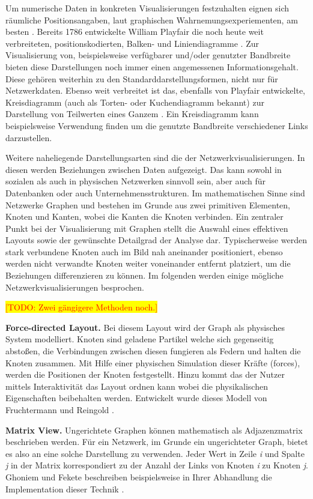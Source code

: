 \documentclass[draft=false
              ,paper=a4
              ,twoside=false
              ,fontsize=11pt
              ,headsepline
              ,BCOR10mm
              ,DIV11
              ]{scrbook}
\newcommand{\TODO}[1]{\colorbox{yellow}{\textcolor{red}{[TODO: #1]}}}
\begin{document}
Um numerische Daten in konkreten Visualisierungen festzuhalten eignen sich räumliche Positionsangaben, laut graphischen Wahrnemungsexperiementen, am besten \cite{heer_tour_2010}. Bereits 1786 entwickelte William Playfair die noch heute weit verbreiteten, positionskodierten, Balken- und Liniendiagramme \cite{playfair_playfairs_1768}. Zur Visualisierung von, beispielsweise verfügbarer und/oder genutzter Bandbreite bieten diese Darstellungen noch immer einen angemessenen Informationsgehalt. Diese gehören weiterhin zu den Standarddarstellungsformen, nicht nur für Netzwerkdaten. Ebenso weit verbreitet ist das, ebenfalls von Playfair entwickelte, Kreisdiagramm (auch als Torten- oder Kuchendiagramm bekannt) zur Darstellung von Teilwerten eines Ganzem \cite{playfair_statistical_1801}. Ein Kreisdiagramm kann beispielsweise Verwendung finden um die genutzte Bandbreite verschiedener Links darzustellen. 

Weitere naheliegende Darstellungsarten sind die der Netzwerkvisualisierungen. In diesen werden Beziehungen zwischen Daten aufgezeigt. Das kann sowohl in sozialen als auch in physischen Netzwerken sinnvoll sein, aber auch für Datenbanken oder auch Unternehmensstrukturen. Im mathematischen Sinne sind Netzwerke Graphen und bestehen im Grunde aus zwei primitiven Elementen, Knoten und Kanten, wobei die Kanten die Knoten verbinden. Ein zentraler Punkt bei der Visualisierung mit Graphen stellt die Auswahl eines effektiven Layouts sowie der gewünschte Detailgrad der Analyse dar. Typischerweise werden stark verbundene Knoten auch im Bild nah aneinander positioniert, ebenso werden nicht verwandte Knoten weiter voneinander entfernt platziert, um die Beziehungen differenzieren zu können. Im folgenden werden einige mögliche Netzwerkvisualisierungen besprochen.

\TODO{Zwei gängigere Methoden noch.}

\textbf{Force-directed Layout.}  Bei diesem Layout wird der Graph als physisches System modelliert. Knoten sind geladene Partikel welche sich gegenseitig abstoßen, die Verbindungen zwischen diesen fungieren als Federn und halten die Knoten zusammen. Mit Hilfe einer physischen Simulation dieser Kräfte (forces), werden die Positionen der Knoten festgestellt. Hinzu kommt das der Nutzer mittels Interaktivität das Layout ordnen kann wobei die physikalischen Eigenschaften beibehalten werden. Entwickelt wurde dieses Modell von Fruchtermann und Reingold \cite{Fruchterman91graphdrawing}. 

\textbf{Matrix View.} Ungerichtete Graphen können mathematisch als Adjazenzmatrix beschrieben werden. Für ein Netzwerk, im Grunde ein ungerichteter Graph, bietet es also an eine solche Darstellung zu verwenden. Jeder Wert in Zeile \textit{i} und Spalte \textit{j} in der Matrix korrespondiert zu der Anzahl der Links von Knoten \textit{i} zu Knoten \textit{j}. Ghoniem und Fekete beschreiben beispielsweise in Ihrer Abhandlung die Implementation dieser Technik \cite{Ghoniem:2003:MVG:1063669.1063698}.
\end{document}
